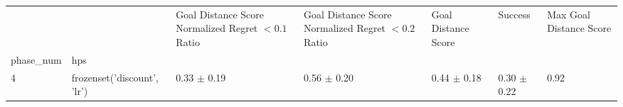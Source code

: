 \begin{tabular}{lllllll}
\toprule
 &  & Goal Distance Score Normalized Regret $< 0.1$ Ratio & Goal Distance Score Normalized Regret $< 0.2$ Ratio & Goal Distance Score & Success & Max Goal Distance Score \\
phase_num & hps &  &  &  &  &  \\
\midrule
4 & frozenset({'discount', 'lr'}) & 0.33 $\pm$ 0.19 & 0.56 $\pm$ 0.20 & 0.44 $\pm$ 0.18 & 0.30 $\pm$ 0.22 & 0.92 \\
\cline{1-7}
\bottomrule
\end{tabular}
